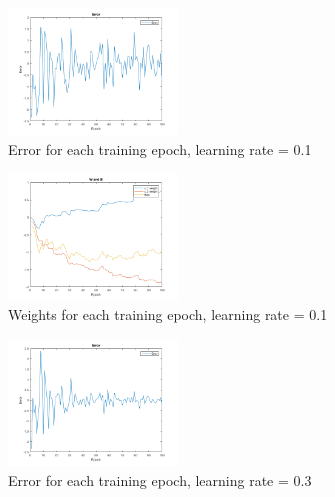 \documentclass{IEEEtran}
\begin{document}
\begin{centering}
\begin{figure}
\begin{center}
	\includegraphics[width=0.4\textwidth]{error_notime_01lr}
	\caption{Error for each training epoch, learning rate = 0.1\label{fig:err01notime}}
\end{center}
\end{figure}
\end{centering}

\begin{centering}
\begin{figure}
\begin{center}
	\includegraphics[width=0.4\textwidth]{weights_notime_01lr}
	\caption{Weights for each training epoch, learning rate = 0.1\label{fig:wgt01notime}}
\end{center}
\end{figure}
\end{centering}

\begin{centering}
\begin{figure}
\begin{center}
	\includegraphics[width=0.4\textwidth]{error_notime_03lr}
	\caption{Error for each training epoch, learning rate = 0.3\label{fig:err03notime}}
\end{center}
\end{figure}
\end{centering}
\end{document}
